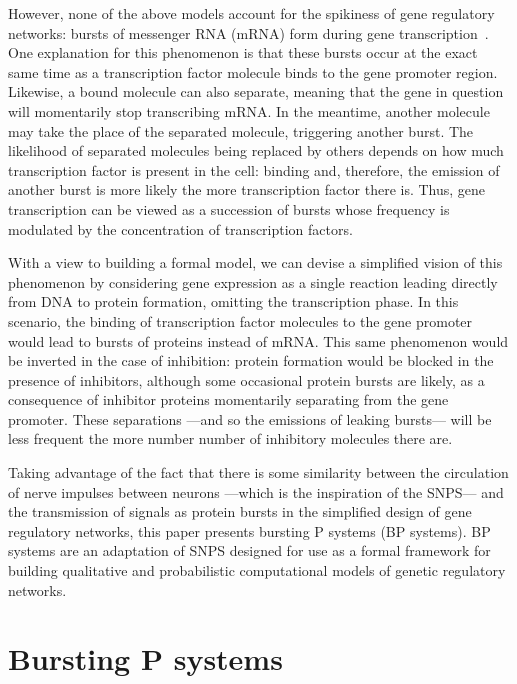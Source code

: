 \documentclass[runningheads,a4paper]{llncs}
\begin{document}
  However, none of the above models account for the spikiness of gene
  regulatory networks: bursts of messenger RNA (mRNA) form during gene
  transcription~\cite{Golding2005,Chubb2006,Raj2006}. One
  explanation for this phenomenon is that these bursts occur at the exact same
  time as a transcription factor molecule binds to the gene promoter region.
  Likewise, a bound molecule can also separate, meaning that the gene in
  question will momentarily stop transcribing mRNA. In the meantime, another
  molecule may take the place of the separated molecule, triggering another
  burst. The likelihood of separated molecules being replaced by others depends
  on how much transcription factor is present in the cell: binding and,
  therefore, the emission of another burst is more likely the more
  transcription factor there is. Thus, gene transcription can be viewed as a
  succession of bursts whose frequency is modulated by the concentration of
  transcription factors.

  With a view to building a formal model, we can devise a simplified vision of
  this phenomenon by considering gene expression as a single reaction leading
  directly from DNA to protein formation, omitting the transcription phase. In
  this scenario, the binding of transcription factor molecules to the gene
  promoter would lead to bursts of proteins instead of mRNA. This same
  phenomenon would be inverted in the case of inhibition: protein formation
  would be blocked in the presence of inhibitors, although some occasional
  protein bursts are likely, as a consequence of inhibitor proteins momentarily
  separating from the gene promoter. These separations ---and so the emissions
  of leaking bursts--- will be less frequent the more number number of
  inhibitory molecules there are.

  Taking advantage of the fact that there is some similarity between the
  circulation of nerve impulses between neurons ---which is the inspiration of
  the SNPS--- and the transmission of signals as protein bursts in the
  simplified design of gene regulatory networks, this paper presents bursting P
  systems (BP systems). BP systems are an adaptation of SNPS designed for use
  as a formal framework for building qualitative and probabilistic
  computational models of genetic regulatory networks.

  
  \section{Bursting P systems}
\end{document}

